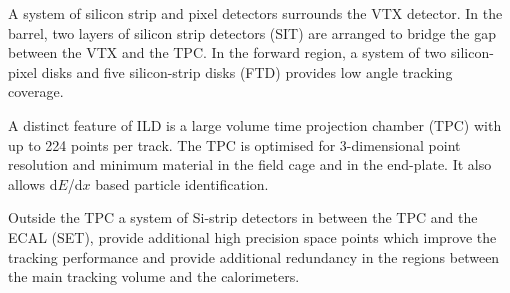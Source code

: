 A system of silicon strip and pixel detectors surrounds the VTX detector. In the barrel, two layers of silicon strip detectors (SIT) are arranged to bridge the gap between the VTX and the TPC. In the forward region, a system of two silicon-pixel disks and five silicon-strip disks (FTD) provides low angle tracking coverage.

A distinct feature of ILD is a large volume time projection chamber (TPC) with up to 224 points per track. The TPC is optimised for 3-dimensional point resolution and minimum material in the field cage and in the end-plate. It also allows d$E$/d$x$ based particle identification.

Outside the TPC a system of Si-strip detectors in between the TPC and the ECAL (SET), provide additional high precision space points which improve the tracking performance and provide additional
    redundancy in the regions between the main tracking volume and the calorimeters. 

